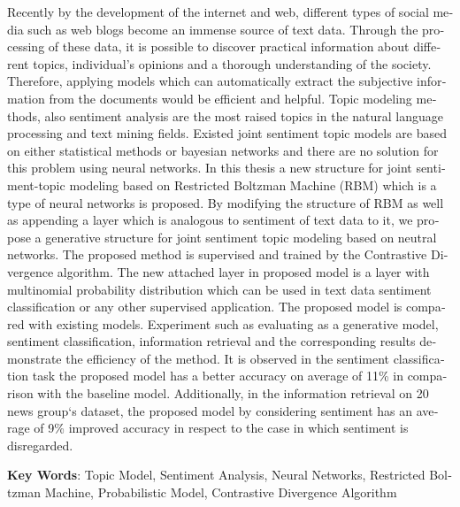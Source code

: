 \begin{latin}
	\begin{small}
		\baselineskip=0.6cm
Recently by the development of the internet and web, different types of social media such as web blogs become an immense source of text data. Through the processing of these data, it is possible to discover practical information about different topics, individual’s opinions and a thorough understanding of the society. Therefore, applying models which can automatically extract the subjective information from the documents would be efficient and helpful. Topic modeling methods, also sentiment analysis are the most raised topics in the natural language processing and text mining fields. Existed joint sentiment topic models are based on either statistical methods or bayesian networks and there are no solution for this problem using neural networks. In this thesis a new structure for joint sentiment-topic modeling based on Restricted Boltzman Machine (RBM) which is a type of neural networks is proposed. By modifying the structure of RBM as well as appending a layer which is analogous to sentiment of text data to it, we propose a generative structure for joint sentiment topic modeling based on neutral networks. The proposed method is supervised and trained by the Contrastive Divergence algorithm. The new attached layer in proposed model is a layer with multinomial probability distribution which can be used in text data sentiment classification or any other supervised application. The proposed model is compared with existing models. Experiment such as evaluating as a generative model, sentiment classification, information retrieval and the corresponding results demonstrate the efficiency of the method. It is observed in the sentiment classification task the proposed model has a better accuracy on average of 11\% in comparison with the baseline model. Additionally, in the information retrieval on 20 news group‘s dataset, the proposed model by considering sentiment has an average of 9\% improved accuracy in respect to the case in which sentiment is disregarded. 
	
		
	\end{small}
	
	\vspace{0.5 cm}
	
	
	\noindent \textbf{Key Words}: Topic Model, Sentiment Analysis, Neural Networks, Restricted Boltzman Machine, Probabilistic Model, Contrastive Divergence Algorithm
\end{latin}

